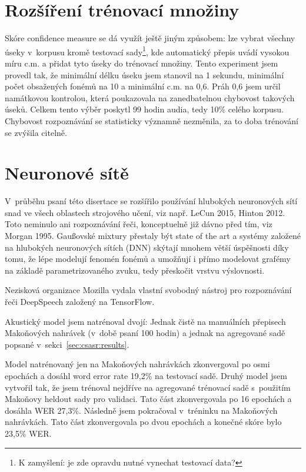 \section{Rozšíření trénovací množiny}
\label{sec:confident}

Skóre confidence measure se dá využít ještě jiným způsobem: lze vybrat všechny
úseky v~korpusu kromě testovací sady\footnote{K zamyšlení: je zde opravdu nutné
vynechat testovací data?}, kde automatický přepis uvádí vysokou míru
c.m. a přidat tyto úseky do trénovací množiny. Tento experiment jsem provedl
tak, že minimální délku úseku jsem stanovil na 1 sekundu, minimální počet
obsažených fonémů na 10 a minimální c.m. na 0,6. Práh 0,6 jsem určil namátkovou
kontrolou, která poukazovala na zanedbatelnou chybovost takových úseků. Celkem
tento výběr poskytl 99 hodin audia, tedy 10\% celého korpusu.
Chybovost rozpoznávání se statisticky významně nezměnila, za to doba trénování
se zvýšila citelně.

\section{Neuronové sítě}
\label{sec:deepspeech}

V~průběhu psaní této disertace se rozšířilo používání hlubokých neuronových sítí
snad ve všech oblastech strojového učení, viz např. LeCun
2015\cite{lecun2015deep}, Hinton 2012\cite{hinton2012deep}. Toto neminulo ani
rozpoznávání řeči, konceptuelně již dávno před tím, viz Morgan 1995\cite{morgan1995neural}. Gaußovské mixtury
přestaly být state of the art a systémy založené na hlubokých neuronových sítích
(DNN) skýtají mnohem větší úspěšnosti díky tomu, že lépe modelují fenomén fonémů
a umožňují i přímo modelovat grafémy na základě parametrizovaného zvuku, tedy
přeskočit vrstvu výslovnosti.

Nezisková organizace Mozilla vydala vlastní svobodný nástroj pro rozpoznávání
řeči DeepSpeech\cite{hannun2014deep} založený na
TensorFlow\cite{abadi2016tensorflow}.

Akustický model jsem natrénoval dvojí: Jednak čistě na manuálních přepisech
Makoňových nahrávek (v~době psaní 100 hodin) a jednak na agregované sadě popsané
v~sekci~\ref{sec:csasr:results}.

Model natrénovaný jen na Makoňových nahrávkách zkonvergoval po osmi epochách a
dosáhl word error rate 19,2\% na testovací sadě. Druhý model jsem vytvořil tak,
že jsem trénoval nejdříve na agregované trénovací sadě s~použitím Makoňovy
heldout sady pro validaci. Tato část zkonvergovala po 16 epochách a dosáhla WER
27,3\%. Následně jsem pokračoval v~tréninku na Makoňových nahrávkách. Tato část
zkonvergovala po dvou epochách a konečné skóre bylo 23,5\% WER.

